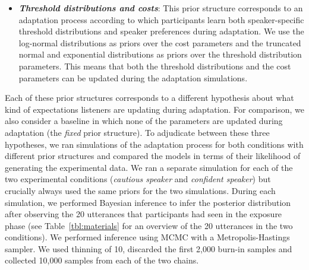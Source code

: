 \documentclass[lucida,biblatex]{sp} %
\begin{document}
\begin{itemize}
\item  \textbf{\textit{Threshold distributions and costs}}:   This prior structure corresponds to an adaptation process according to which participants learn both speaker-specific threshold distributions and speaker preferences during adaptation.  We use the log-normal distributions as priors over the cost parameters and the truncated normal and exponential distributions as priors over the threshold distribution parameters. This means that both the threshold distributions and the cost parameters can be updated during the adaptation simulations.
\end{itemize}

Each of these prior structures corresponds to a different hypothesis about what kind of expectations listeners are updating during adaptation. For comparison, we also consider a baseline in which none of the parameters are updated during adaptation (the {\it fixed} prior structure). To adjudicate between these three hypotheses, we ran simulations of the adaptation process for both conditions with different prior structures and compared the models in terms of their likelihood of generating the experimental data.
We ran a separate simulation for each of the two experimental conditions (\textit{cautious speaker} and \textit{confident speaker})  but crucially always used the same priors for the two simulations. During each simulation, we performed Bayesian inference to infer the posterior distribution after observing the 20 utterances that participants had seen in the exposure phase (see Table~\ref{tbl:materials} for an overview of the 20 utterances in the two conditions). We performed inference using MCMC with a Metropolis-Hastings sampler. We used thinning of 10, discarded the first 2,000 burn-in samples and collected 10,000 samples from each of the two chains.
\end{document}
